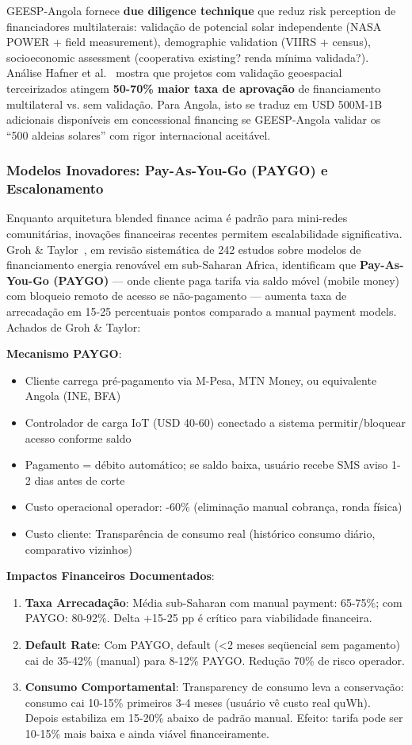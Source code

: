 \documentclass[12pt, a4paper]{article}
\begin{document}
GEESP-Angola fornece 
\textbf{due diligence technique} que reduz risk perception de financiadores multilaterais: validação de potencial solar independente (NASA POWER + field measurement), demographic validation (VIIRS + census), socioeconomic assessment (cooperativa existing? renda mínima validada?). Análise Hafner et al.~\citep{Hafner2020} mostra que projetos com validação geoespacial terceirizados atingem 
\textbf{50-70\% maior taxa de aprovação} de financiamento multilateral vs. sem validação. Para Angola, isto se traduz em USD 500M-1B adicionais disponíveis em concessional financing se GEESP-Angola validar os ``500 aldeias solares'' com rigor internacional aceitável.

\subsubsection{Modelos Inovadores: Pay-As-You-Go (PAYGO) e Escalonamento}

Enquanto arquitetura blended finance acima é padrão para mini-redes comunitárias, inovações financeiras recentes permitem escalabilidade significativa. Groh \& Taylor~\citep{Groh2015}, em revisão sistemática de 242 estudos sobre modelos de financiamento energia renovável em sub-Saharan Africa, identificam que \textbf{Pay-As-You-Go (PAYGO)} — onde cliente paga tarifa via saldo móvel (mobile money) com bloqueio remoto de acesso se não-pagamento — aumenta taxa de arrecadação em 15-25 percentuais pontos comparado a manual payment models. Achados de Groh \& Taylor:

\textbf{Mecanismo PAYGO}:
\begin{itemize}
\item Cliente carrega pré-pagamento via M-Pesa, MTN Money, ou equivalente Angola (INE, BFA)
\item Controlador de carga IoT (USD 40-60) conectado a sistema permitir/bloquear acesso conforme saldo
\item Pagamento = débito automático; se saldo baixa, usuário recebe SMS aviso 1-2 dias antes de corte
\item Custo operacional operador: -60\% (eliminação manual cobrança, ronda física)
\item Custo cliente: Transparência de consumo real (histórico consumo diário, comparativo vizinhos)
\end{itemize}

\textbf{Impactos Financeiros Documentados}:
\begin{enumerate}
\item \textbf{Taxa Arrecadação}: Média sub-Saharan com manual payment: 65-75\%; com PAYGO: 80-92\%. Delta +15-25 pp é crítico para viabilidade financeira.
\item \textbf{Default Rate}: Com PAYGO, default (<2 meses seqüencial sem pagamento) cai de 35-42\% (manual) para 8-12\% PAYGO. Redução 70\% de risco operador.
\item \textbf{Consumo Comportamental}: Transparency de consumo leva a conservação: consumo cai 10-15\% primeiros 3-4 meses (usuário vê custo real quWh). Depois estabiliza em 15-20\% abaixo de padrão manual. Efeito: tarifa pode ser 10-15\% mais baixa e ainda viável financeiramente.
\end{enumerate}
\end{document}
